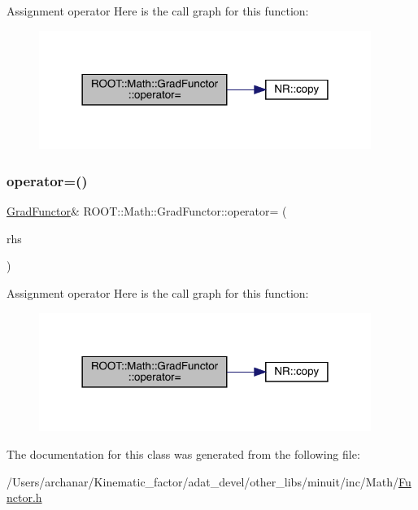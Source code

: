 Assignment operator Here is the call graph for this function\+:
\nopagebreak
\begin{figure}[H]
\begin{center}
\leavevmode
\includegraphics[width=306pt]{de/d74/classROOT_1_1Math_1_1GradFunctor_a7f7a0c6b466d283cb6085f0e57ab1e6a_cgraph}
\end{center}
\end{figure}
\mbox{\label{classROOT_1_1Math_1_1GradFunctor_a7f7a0c6b466d283cb6085f0e57ab1e6a}} 
\subsubsection{\texorpdfstring{operator=()}{operator=()}\hspace{0.1cm}{\footnotesize\ttfamily [2/2]}}
{\footnotesize\ttfamily \mbox{\hyperlink{classROOT_1_1Math_1_1GradFunctor}{Grad\+Functor}}\& R\+O\+O\+T\+::\+Math\+::\+Grad\+Functor\+::operator= (\begin{DoxyParamCaption}\item[{const \mbox{\hyperlink{classROOT_1_1Math_1_1GradFunctor}{Grad\+Functor}} \&}]{rhs }\end{DoxyParamCaption})\hspace{0.3cm}{\ttfamily [inline]}}

Assignment operator Here is the call graph for this function\+:
\nopagebreak
\begin{figure}[H]
\begin{center}
\leavevmode
\includegraphics[width=306pt]{de/d74/classROOT_1_1Math_1_1GradFunctor_a7f7a0c6b466d283cb6085f0e57ab1e6a_cgraph}
\end{center}
\end{figure}


The documentation for this class was generated from the following file\+:\begin{DoxyCompactItemize}
\item 
/\+Users/archanar/\+Kinematic\+\_\+factor/adat\+\_\+devel/other\+\_\+libs/minuit/inc/\+Math/\mbox{\hyperlink{other__libs_2minuit_2inc_2Math_2Functor_8h}{Functor.\+h}}\end{DoxyCompactItemize}
